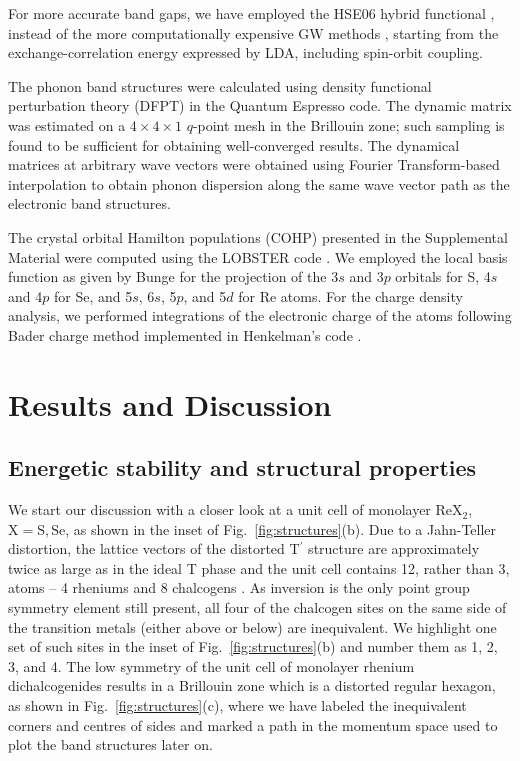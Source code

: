 \documentclass[reprint, superscriptaddress, amsmath,amssymb,prb,twocolumn]{revtex4-2}
\begin{document}
For more accurate band gaps, we have employed the HSE06 hybrid functional \cite{HSE06_2003, HSE06_2006}, instead of the more computationally expensive GW methods \cite{Hedin_1965, SLouie_2003,SGW2020}, starting from the exchange-correlation energy expressed by LDA, including spin-orbit coupling. 

The phonon band structures were calculated using density functional perturbation theory (DFPT) \cite{baroni_rmp_2001} in the Quantum Espresso code. The dynamic matrix was estimated on a $4\times4\times1$ $q$-point mesh in the Brillouin zone; such sampling is found to be sufficient for obtaining well-converged results. The dynamical matrices at arbitrary wave vectors were obtained using Fourier Transform-based interpolation to obtain phonon dispersion along the same wave vector path as the electronic band structures. 

The crystal orbital Hamilton populations (COHP) \cite{dronskowski_jpc_1993} presented in the Supplemental Material \cite{SM} were computed using the LOBSTER code \cite{maintz_jcc_2013, maintz_jcc_2016}. We employed the local basis function as given by Bunge \cite{bunge_adnd_1993} for the projection of the 3$s$ and 3$p$ orbitals for S, 4$s$ and 4$p$ for Se, and 5$s$, 6$s$, 5$p$, and 5$d$ for Re atoms. For the charge density analysis, we performed integrations of the electronic charge of the atoms following Bader charge method implemented in Henkelman's code \cite{henkelman_cms_2006, sanville_jcc_2007, tang_jpcm_2009, yu_jcp_2011}.

\section{Results and Discussion}
    \subsection{Energetic stability and structural properties}

We start our discussion with a closer look at a unit cell of monolayer ReX$_2$, $\mathrm{X=S,Se}$, as shown in the inset of Fig.~\ref{fig:structures}(b). Due to a Jahn-Teller distortion, the lattice vectors of the distorted T$^\prime$ structure are approximately twice as large as in the ideal T phase and the unit cell contains 12, rather than 3, atoms -- 4 rheniums and 8 chalcogens \cite{lamfers_jac_1996, kertesz_jacs_1984}. As inversion is the only point group symmetry element still present, all four of the chalcogen sites on the same side of the transition metals (either above or below) are inequivalent. We highlight one set of such sites in the inset of Fig.~\ref{fig:structures}(b) and number them as 1, 2, 3, and 4. The low symmetry of the unit cell of monolayer rhenium dichalcogenides results in a Brillouin zone which is a distorted regular hexagon, as shown in Fig.~\ref{fig:structures}(c), where we have labeled the inequivalent corners and centres of sides and marked a path in the momentum space used to plot the band structures later on.
\end{document}
